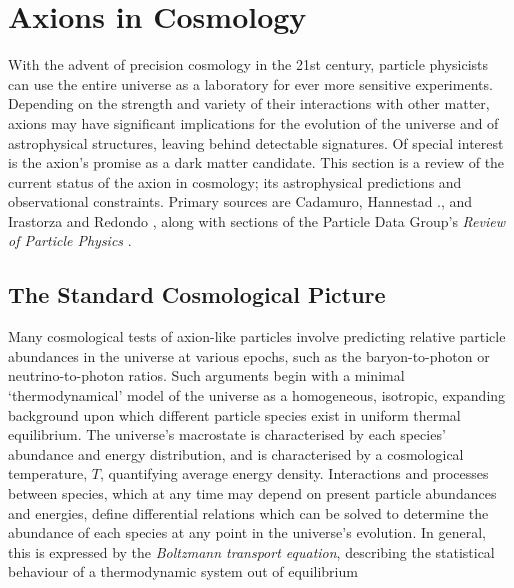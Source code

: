 \chapter{Axions in Cosmology}


With the advent of precision cosmology in the 21st century, particle physicists can use the entire universe as a laboratory for ever more sensitive experiments.
Depending on the strength and variety of their interactions with other matter, axions may have significant implications for the evolution of the universe and of astrophysical structures, leaving behind detectable signatures.
Of special interest is the axion's promise as a dark matter candidate.
This section is a review of the current status of the axion in cosmology; its astrophysical predictions and observational constraints.
Primary sources are Cadamuro, Hannestad \etal., \cite[{}2011]{Cadamuro_2011} and Irastorza and Redondo \cite[{}2018]{Irastorza_2018}, along with sections of the Particle Data Group's \emph{Review of Particle Physics} \cite[{}2020]{ParticleDataGroup-review-2020}.






\section{The Standard Cosmological Picture}

Many cosmological tests of axion-like particles involve predicting relative particle abundances in the universe at various epochs, such as the baryon-to-photon or neutrino-to-photon ratios.
Such arguments begin with a minimal `thermodynamical' model of the universe as a homogeneous, isotropic, expanding background upon which different particle species exist in uniform thermal equilibrium.
The universe's macrostate is characterised by each species' abundance and energy distribution, and is characterised by a cosmological temperature, $T$, quantifying average energy density.
Interactions and processes between species, which at any time may depend on present particle abundances and energies, define differential relations which can be solved to determine the abundance of each species at any point in the universe's evolution.
In general, this is expressed by the \emph{Boltzmann transport equation}, describing the statistical behaviour of a thermodynamic system out of equilibrium \cite[§\,3]{Irastorza_2018}


